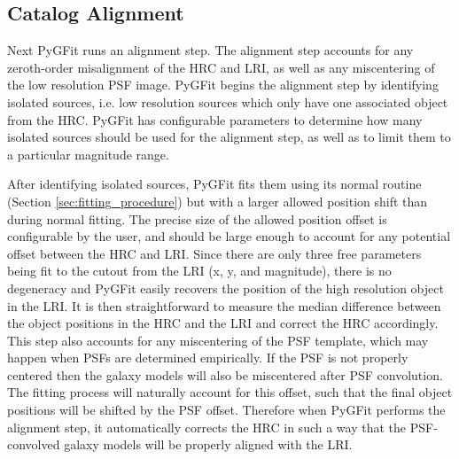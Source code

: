 \documentclass[preprint]{aastex}
\newcommand{\pygfit}{PyGFit}
\begin{document}
\subsection{Catalog Alignment}\label{sec:alignment}

Next \pygfit{} runs an alignment step.  The alignment step accounts for any zeroth-order misalignment of the HRC and LRI, as well as any miscentering of the low resolution PSF image.  \pygfit{} begins the alignment step by identifying isolated sources, i.e. low resolution sources which only have one associated object from the HRC.  \pygfit{} has configurable parameters to determine how many isolated sources should be used for the alignment step, as well as to limit them to a particular magnitude range.

After identifying isolated sources, \pygfit{} fits them using its normal routine (Section \ref{sec:fitting_procedure}) but with a larger allowed position shift than during normal fitting.  The precise size of the allowed position offset is configurable by the user, and should be large enough to account for any potential offset between the HRC and LRI.  Since there are only three free parameters being fit to the cutout from the LRI (x, y, and magnitude), there is no degeneracy and \pygfit{} easily recovers the position of the high resolution object in the LRI.  It is then straightforward to measure the median difference between the object positions in the HRC and the LRI and correct the HRC accordingly.  This step also accounts for any miscentering of the PSF template, which may happen when PSFs are determined empirically. If the PSF is not properly centered then the galaxy models will also be miscentered after PSF convolution.  The fitting process will naturally account for this offset, such that the final object positions will be shifted by the PSF offset.  Therefore when \pygfit{} performs the alignment step, it automatically corrects the HRC in such a way that the PSF-convolved galaxy models will be properly aligned with the LRI.

\end{document}
